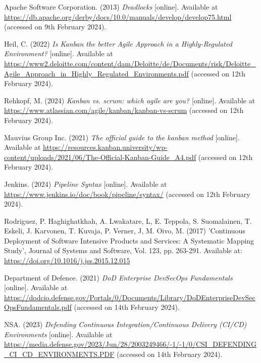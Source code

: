 \noindent Apache Software Corporation. (2013) \textit{Deadlocks} [online]. Available at \url{https://db.apache.org/derby/docs/10.0/manuals/develop/develop75.html} (accessed on 9th February 2024).
\vspace{0.2cm}

\noindent Heil, C. (2022) \textit{Is Kanban the better Agile Approach in a Highly-Regulated Environment?} [online]. Available at \url{https://www2.deloitte.com/content/dam/Deloitte/de/Documents/risk/Deloitte_Agile_Approach_in_Highly_Regulated_Environments.pdf} (accessed on 12th February 2024).
\vspace{0.2cm}

\noindent Rehkopf, M. (2024) \textit{Kanban vs. scrum: which agile are you?} [online]. Available at \url{https://www.atlassian.com/agile/kanban/kanban-vs-scrum} (accessed on 12th February 2024).
\vspace{0.2cm}

\noindent Mauvius Group Inc. (2021) \textit{The official guide to the kanban method} [online]. Available at \url{https://resources.kanban.university/wp-content/uploads/2021/06/The-Official-Kanban-Guide_A4.pdf} (accessed on 12th February 2024).
\vspace{0.2cm}

\noindent Jenkins. (2024) \textit{Pipeline Syntax} [online]. Available at \url{https://www.jenkins.io/doc/book/pipeline/syntax/} (accessed on 12th February 2024).
\vspace{0.2cm}

\noindent Rodriguez, P. Haghighatkhah, A. Lwakatare, L, E. Teppola, S. Suomalainen, T. Eskeli, J. Karvonen, T. Kuvaja, P. Verner, J, M. Oivo, M. (2017) 'Continuous Deployment of Software Intensive Products and Services: A Systematic Mapping Study', Journal of Systems and Software, Vol. 123, pp. 263-291. Available at: \url{https://doi.org/10.1016/j.jss.2015.12.015}
\vspace{0.2cm}

\noindent Department of Defence. (2021) \textit{DoD Enterprise DevSecOps Fundamentals} [online]. Available at \url{https://dodcio.defense.gov/Portals/0/Documents/Library/DoDEnterpriseDevSecOpsFundamentals.pdf} (accessed on 14th February 2024).
\vspace{0.2cm}

\noindent NSA. (2023) \textit{Defending Continuous Integration/Continuous Delivery (CI/CD) Environments} [online]. Available at \url{https://media.defense.gov/2023/Jun/28/2003249466/-1/-1/0/CSI_DEFENDING_CI_CD_ENVIRONMENTS.PDF} (accessed on 14th February 2024).
\vspace{0.2cm}

